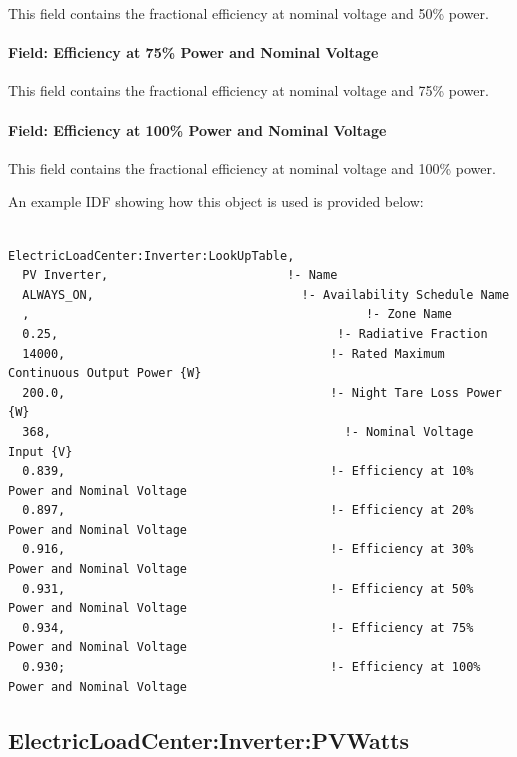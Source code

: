 This field contains the fractional efficiency at nominal voltage and 50\% power.

\paragraph{Field: Efficiency at 75\% Power and Nominal Voltage}\label{field-efficiency-at-75-power-and-nominal-voltage}

This field contains the fractional efficiency at nominal voltage and 75\% power.

\paragraph{Field: Efficiency at 100\% Power and Nominal Voltage}\label{field-efficiency-at-100-power-and-nominal-voltage}

This field contains the fractional efficiency at nominal voltage and 100\% power.

An example IDF showing how this object is used is provided below:

\begin{lstlisting}

ElectricLoadCenter:Inverter:LookUpTable,
  PV Inverter,                         !- Name
  ALWAYS_ON,                             !- Availability Schedule Name
  ,                                               !- Zone Name
  0.25,                                       !- Radiative Fraction
  14000,                                     !- Rated Maximum Continuous Output Power {W}
  200.0,                                     !- Night Tare Loss Power {W}
  368,                                         !- Nominal Voltage Input {V}
  0.839,                                     !- Efficiency at 10% Power and Nominal Voltage
  0.897,                                     !- Efficiency at 20% Power and Nominal Voltage
  0.916,                                     !- Efficiency at 30% Power and Nominal Voltage
  0.931,                                     !- Efficiency at 50% Power and Nominal Voltage
  0.934,                                     !- Efficiency at 75% Power and Nominal Voltage
  0.930;                                     !- Efficiency at 100% Power and Nominal Voltage
\end{lstlisting}

\subsection{ElectricLoadCenter:Inverter:PVWatts}\label{electricloadcenterinverterpvwatts}

